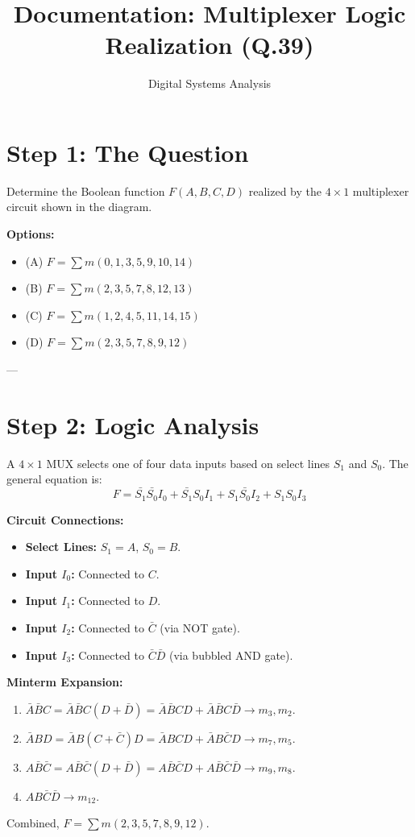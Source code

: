 \documentclass[11pt]{article}
\begin{document}
\title{Documentation: Multiplexer Logic Realization (Q.39)}
\author{Digital Systems Analysis}
\date{}
\maketitle

\section{Step 1: The Question}
Determine the Boolean function $F(A, B, C, D)$ realized by the $4 \times 1$ multiplexer circuit shown in the diagram.

\textbf{Options:}
\begin{itemize}
    \item (A) $F = \sum m(0, 1, 3, 5, 9, 10, 14)$
    \item (B) $F = \sum m(2, 3, 5, 7, 8, 12, 13)$
    \item (C) $F = \sum m(1, 2, 4, 5, 11, 14, 15)$
    \item (D) $F = \sum m(2, 3, 5, 7, 8, 9, 12)$
\end{itemize}

---

\section{Step 2: Logic Analysis}
A $4 \times 1$ MUX selects one of four data inputs based on select lines $S_1$ and $S_0$. The general equation is:
\[ F = \bar{S_1}\bar{S_0}I_0 + \bar{S_1}S_0I_1 + S_1\bar{S_0}I_2 + S_1S_0I_3 \]

\textbf{Circuit Connections:}
\begin{itemize}
    \item \textbf{Select Lines:} $S_1 = A$, $S_0 = B$.
    \item \textbf{Input $I_0$:} Connected to $C$.
    \item \textbf{Input $I_1$:} Connected to $D$.
    \item \textbf{Input $I_2$:} Connected to $\bar{C}$ (via NOT gate).
    \item \textbf{Input $I_3$:} Connected to $\bar{C}\bar{D}$ (via bubbled AND gate).
\end{itemize}

\textbf{Minterm Expansion:}
\begin{enumerate}
    \item $\bar{A}\bar{B}C = \bar{A}\bar{B}C(D + \bar{D}) = \bar{A}\bar{B}CD + \bar{A}\bar{B}C\bar{D} \rightarrow m_3, m_2$.
    \item $\bar{A}BD = \bar{A}B(C + \bar{C})D = \bar{A}BCD + \bar{A}B\bar{C}D \rightarrow m_7, m_5$.
    \item $A\bar{B}\bar{C} = A\bar{B}\bar{C}(D + \bar{D}) = A\bar{B}\bar{C}D + A\bar{B}\bar{C}\bar{D} \rightarrow m_9, m_8$.
    \item $AB\bar{C}\bar{D} \rightarrow m_{12}$.
\end{enumerate}
Combined, $F = \sum m(2, 3, 5, 7, 8, 9, 12)$.
\end{document}
